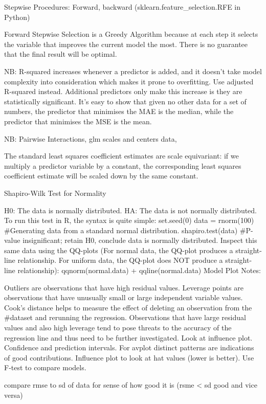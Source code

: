\documentclass[]{book}
\theoremstyle{definition}
\theoremstyle{definition}
\theoremstyle{definition}
\theoremstyle{remark}
\begin{document}
Stepwise Procedures: Forward, backward (sklearn.feature\_selection.RFE
in Python)

Forward Stepwise Selection is a Greedy Algorithm because at each step it
selects the variable that improves the current model the most. There is
no guarantee that the final result will be optimal.

NB: R-squared increases whenever a predictor is added, and it doesn't
take model complexity into consideration which makes it prone to
overfitting. Use adjusted R-squared instead. Additional predictors only
make this increase is they are statistically significant. It's easy to
show that given no other data for a set of numbers, the predictor that
minimises the MAE is the median, while the predictor that minimises the
MSE is the mean.

NB: Pairwise Interactions, glm scales and centers data,

The standard least squares coefficient estimates are scale equivariant:
if we multiply a predictor variable by a constant, the corresponding
least squares coefficient estimate will be scaled down by the same
constant.

Shapiro-Wilk Test for Normality

H0: The data is normally distributed. HA: The data is not normally
distributed. To run this test in R, the syntax is quite simple:
set.seed(0) data = rnorm(100) \#Generating data from a standard normal
distribution. shapiro.test(data) \#P-value insignificant; retain H0,
conclude data is normally distributed. Inspect this same data using the
QQ-plots (For normal data, the QQ-plot produces a straight-line
relationship. For uniform data, the QQ-plot does NOT produce a
straight-line relationship): qqnorm(normal.data) + qqline(normal.data)
Model Plot Notes:

Outliers are observations that have high residual values. Leverage
points are observations that have unusually small or large independent
variable values. Cook's distance helps to measure the effect of deleting
an observation from the \#dataset and rerunning the regression.
Observations that have large residual values and also high leverage tend
to pose threats to the accuracy of the regression line and thus need to
be further investigated. Look at influence plot. Confidence and
prediction intervals. For avplot distinct patterns are indications of
good contributions. Influence plot to look at hat values (lower is
better). Use F-test to compare models.

compare rmse to sd of data for sense of how good it is (rsme \textless{}
sd good and vice versa)
\end{document}
